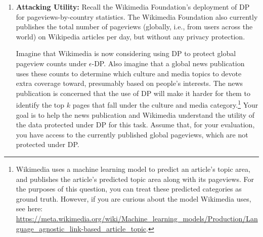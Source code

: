\documentclass[11pt]{article}
\begin{document}
\begin{enumerate}[leftmargin=*]
\begin{enumerate}
\item The dataset \texttt{FultonPUMS5full.csv}
provides the 5\% PUMS Census file for Fulton.
For $\varepsilon=1$
and each $B \in \{5\times 10^5, 5\times 10^6, 5\times 10^7\}$, estimate the RMSE of DP mean income for
each PUMA in Fulton.\footnote{You can assume that the size
of each PUMA dataset is public information.} Run this analysis to compare (i) the ordinary
Laplace mechanism for a mean and (ii) the
algorithm from Part~\ref{part:ExpWinsorized}. Show box-and-whisker plots of the DP mean incomes for each PUMA and algorithm, noting the true means. 
(In the GitHub repo, we have given you \texttt{hw6\_starter.py} for producing such plots comparing 
the your algorithm from Part~\ref{part:ExpWinsorized} to the ordinary
Laplace mechanism). Order PUMA by mean income, or perhaps skew of income, or anything you think reveals an interesting pattern.  Give an intuitive explanation of the cases (datasets and parameter settings) in which algorithm (i) performs better than algorithm (ii) and vice-versa. 
\end{enumerate}



\item \textbf{Attacking Utility:}
Recall the Wikimedia Foundation's deployment of DP for pageviews-by-country statistics. The Wikimedia Foundation also currently publishes the total number of pageviews (globally, i.e., from users across the world) on Wikipedia articles per day, but without any privacy protection. 

Imagine that Wikimedia is now considering using DP to protect global pageview counts under $\epsilon$-DP. Also imagine that a global news publication uses these counts to determine which culture and media topics to devote extra coverage toward, presumably based on people's interests. The news publication is concerned that the use of DP will make it harder for them to identify the top $k$ pages that fall under the culture and media category.\footnote{Wikimedia uses a machine learning model to predict an article's topic area, and publishes the article's predicted topic area along with its pageviews. For the purposes of this question, you can treat these predicted categories as ground truth. However, if you are curious about the model Wikimedia uses, see here: \url{https://meta.wikimedia.org/wiki/Machine_learning_models/Production/Language_agnostic_link-based_article_topic}.} Your goal is to help the news publication and Wikimedia understand the utility of the data protected under DP for this task. Assume that, for your evaluation, you have access to the currently published global pageviews, which are not protected under DP.


\end{enumerate}
\end{document}
